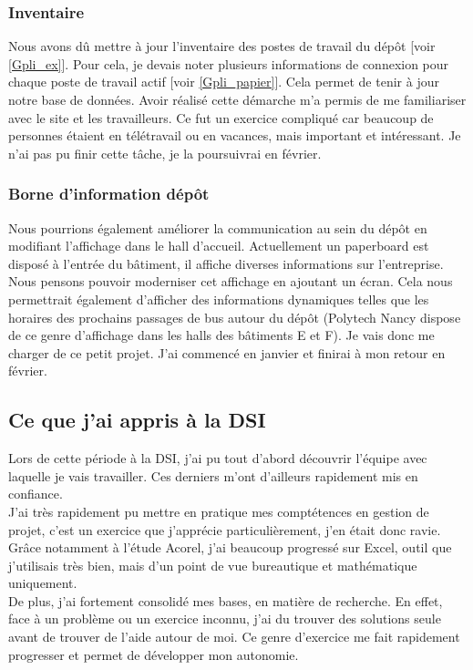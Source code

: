 \documentclass{article}
\begin{document}
        \subsubsection{Inventaire}
        Nous avons dû mettre à jour l'inventaire des postes de travail du dépôt [voir \ref{Gpli_ex}]. 
        Pour cela, je devais noter plusieurs informations de connexion pour 
        chaque poste de travail actif [voir \ref{Gpli_papier}]. Cela permet de tenir à jour notre base 
        de données. Avoir réalisé cette démarche m'a permis de me familiariser 
        avec le site et les travailleurs. Ce fut un exercice compliqué car beaucoup 
        de personnes étaient en télétravail ou en vacances, mais important et 
        intéressant. Je n'ai pas pu finir cette tâche, je la poursuivrai en février.

        \subsubsection{Borne d'information dépôt}
        Nous pourrions également améliorer la communication au sein du dépôt en 
        modifiant l'affichage dans le hall d'accueil. Actuellement un 
        paperboard est disposé à l'entrée du bâtiment, il affiche diverses 
        informations sur l'entreprise. Nous pensons pouvoir moderniser cet 
        affichage en ajoutant un écran. Cela nous permettrait également 
        d'afficher des informations dynamiques telles que les horaires des 
        prochains passages de bus autour du dépôt (Polytech Nancy dispose de ce genre 
        d'affichage dans les halls des bâtiments E et F). Je vais donc me charger 
        de ce petit projet. J'ai commencé en janvier et finirai à mon retour en 
        février.

    \subsection{Ce que j'ai appris à la DSI}
        Lors de cette période à la DSI, j'ai pu tout d'abord découvrir l'équipe avec laquelle 
        je vais travailler. Ces derniers m'ont d'ailleurs rapidement mis en confiance.\\
        J'ai très rapidement pu mettre en pratique mes comptétences en gestion de projet, 
        c'est un exercice que j'apprécie particulièrement, j'en était donc ravie.\\
        Grâce notamment à l'étude Acorel, j'ai beaucoup progressé sur Excel, outil que 
        j'utilisais très bien, mais d'un point de vue bureautique et mathématique 
        uniquement.\\
        De plus, j'ai fortement consolidé mes bases, en matière de recherche. 
        En effet, face à un problème ou un exercice inconnu, j'ai du trouver des solutions
        seule avant de trouver de l'aide autour de moi. Ce genre d'exercice
        me fait rapidement progresser et permet de développer mon autonomie.
\end{document}
